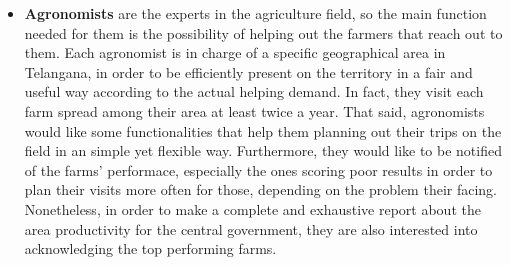 \documentclass[table, 12pt]{article}
\begin{document}
\begin{itemize}
    \item \textbf{Agronomists} are the experts in the agriculture field, so the main function needed for them is the possibility of helping out the farmers that reach out to them. Each agronomist is in charge of a specific geographical area in Telangana, in order to be efficiently present on the territory in a fair and useful way according to the actual helping demand. In fact, they visit each farm spread among their area at least twice a year. That said, agronomists would like some functionalities that help them planning out their trips on the field in an simple yet flexible way. Furthermore, they would like to be notified of the farms' performace, especially the ones scoring poor results in order to plan their visits more often for those, depending on the problem their facing. Nonetheless, in order to make a complete and exhaustive report about the area productivity for the central government, they are also interested into acknowledging the top performing farms. %
\end{itemize}
\end{document}

